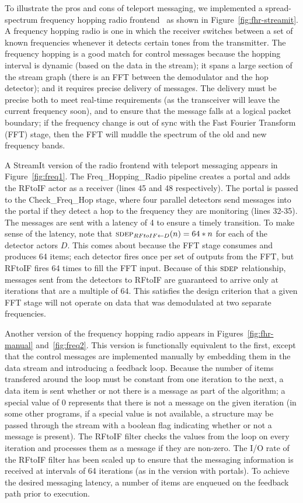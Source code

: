 To illustrate the pros and cons of teleport messaging, we implemented
a spread-spectrum frequency hopping radio frontend~\cite{harada02} as
shown in Figure~\ref{fig:fhr-streamit}.  A frequency hopping radio is
one in which the receiver switches between a set of known frequencies
whenever it detects certain tones from the transmitter.  The frequency
hopping is a good match for control messages because the hopping
interval is dynamic (based on the data in the stream); it spans a
large section of the stream graph (there is an FFT between the
demodulator and the hop detector); and it requires precise delivery of
messages.  The delivery must be precise both to meet real-time
requirements (as the transceiver will leave the current frequency
soon), and to ensure that the message falls at a logical packet
boundary; if the frequency change is out of sync with the Fast Fourier
Transform (FFT) stage, then the FFT will muddle the spectrum of the
old and new frequency bands.

A StreamIt version of the radio frontend with teleport messaging
appears in Figure~\ref{fig:freq1}.  The Freq\_Hopping\_Radio pipeline
creates a portal and adds the RFtoIF actor as a receiver (lines 45 and 48 respectively).  The portal
is passed to the Check\_Freq\_Hop stage, where four parallel detectors
send messages into the portal if they detect a hop to the frequency
they are monitoring (lines 32-35).  The messages are sent with a latency of 4 to
ensure a timely transition.  To make sense of the latency, note that
$\sdepf{RFtoIF}{D}(n) = 64*n$ for each of the detector actors $D$.
This comes about because the FFT stage consumes and produces 64 items;
each detector fires once per set of outputs from the FFT, but RFtoIF
fires 64 times to fill the FFT input.  Because of this $\textsc{sdep}$
relationship, messages sent from the detectors to RFtoIF are
guaranteed to arrive only at iterations that are a multiple of 64.
This satisfies the design criterion that a given FFT stage will not
operate on data that was demodulated at two separate frequencies.

Another version of the frequency hopping radio appears in
Figures~\ref{fig:fhr-manual} and~\ref{fig:freq2}.  This version is
functionally equivalent to the first, except that the control messages
are implemented manually by embedding them in the data stream and
introducing a feedback loop.  Because the number of items transfered
around the loop must be constant from one iteration to the next, a
data item is sent whether or not there is a message as part of the
algorithm; a special value of 0 represents that there is not a message
on the given iteration (in some other programs, if a special value is
not available, a structure may be passed through the stream with a
boolean flag indicating whether or not a message is present).  The
RFtoIF filter checks the values from the loop on every iteration and
processes them as a message if they are non-zero.  The I/O rate of the
RFtoIF filter has been scaled up to ensure that the messaging
information is received at intervals of 64 iterations (as in the
version with portals).  To achieve the desired messaging latency, a
number of items are enqueued on the feedback path prior to execution.

